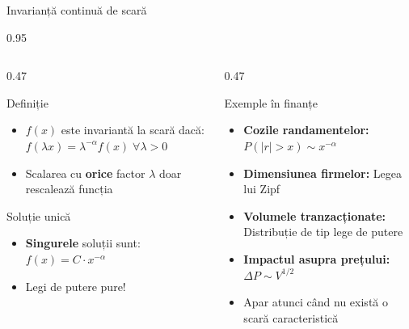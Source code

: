 \documentclass[9pt, aspectratio=169, t]{beamer}
\begin{document}
\begin{frame}{Invarianță continuă de scară}
    \begin{cminipage}{0.95\textwidth}
    {\footnotesize
    \begin{columns}[T]
        \begin{column}{0.47\textwidth}
            \begin{block}{Definiție}
                \begin{itemize}\setlength{\itemsep}{0pt}
                    \item $f(x)$ este invariantă la scară dacă: $f(\lambda x) = \lambda^{-\alpha} f(x) \;\forall \lambda > 0$
                    \item Scalarea cu \textbf{orice} factor $\lambda$ doar rescalează funcția
                \end{itemize}
            \end{block}

            \begin{exampleblock}{Soluție unică}
                \begin{itemize}\setlength{\itemsep}{0pt}
                    \item \textbf{Singurele} soluții sunt: $f(x) = C \cdot x^{-\alpha}$
                    \item Legi de putere pure!
                \end{itemize}
            \end{exampleblock}
        \end{column}
        \begin{column}{0.47\textwidth}
            \begin{exampleblock}{Exemple în finanțe}
                \begin{itemize}\setlength{\itemsep}{0pt}
                    \item \textbf{Cozile randamentelor:} $P(|r| > x) \sim x^{-\alpha}$
                    \item \textbf{Dimensiunea firmelor:} Legea lui Zipf
                    \item \textbf{Volumele tranzacționate:} Distribuție de tip lege de putere
                    \item \textbf{Impactul asupra prețului:} $\Delta P \sim V^{1/2}$
                    \item Apar atunci când nu există o scară caracteristică
                \end{itemize}
            \end{exampleblock}


\end{column}
\end{columns}}
\end{cminipage}
\end{frame}
\end{document}
